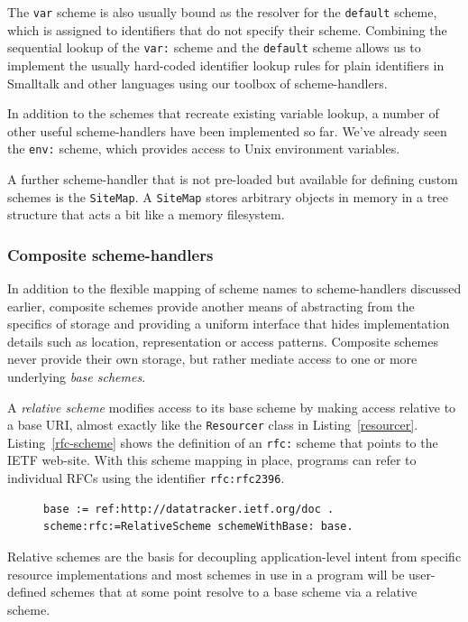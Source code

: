\documentclass[preprint]{sigplanconf}
\begin{document}
The {\tt var} scheme is also usually bound as the resolver for the {\tt default}
scheme, which is assigned to identifiers that do not specify their scheme.
Combining the sequential lookup of the {\tt var:} scheme and the {\tt default}
scheme allows us to implement the usually hard-coded identifier lookup
rules for plain identifiers in Smalltalk and other languages using
our toolbox of scheme-handlers.

In addition to the schemes that recreate existing variable lookup, a number
of other useful scheme-handlers have been implemented so far.  We've
already seen the {\tt env:} scheme, which provides access to Unix
environment variables.  

A further scheme-handler that is not pre-loaded but available for defining
custom schemes is the {\tt SiteMap}.  A {\tt SiteMap} stores arbitrary objects
in memory in a tree structure that acts a bit like a memory filesystem.

\subsubsection{Composite scheme-handlers}

In addition to the flexible mapping of scheme names to scheme-handlers discussed
earlier, composite schemes provide another means of abstracting from the specifics 
of storage and providing a uniform interface that hides implementation details such
as location, representation or access patterns.  Composite schemes never provide
their own storage, but rather mediate access to one or more underlying \emph{base schemes}.

A \emph{relative scheme} modifies access to its base scheme by making
access relative to a base URI, almost exactly like the {\tt Resourcer} class 
in Listing~\ref{resourcer}.  Listing~\ref{rfc-scheme} shows the definition
of an {\tt rfc:} scheme that points to the IETF web-site.   With this scheme mapping in place,
programs can refer to individual RFCs using the identifier {\tt  rfc:rfc2396}.

\begin{figure}[htbp]
\begin{lstlisting}[style=numbers,label=rfc-scheme,caption=Defining a custom rfc: scheme.]
base := ref:http://datatracker.ietf.org/doc .
scheme:rfc:=RelativeScheme schemeWithBase: base.
\end{lstlisting}
\end{figure}

Relative schemes are
the basis for decoupling application-level intent from specific resource implementations
and most schemes in use in a program will be user-defined schemes that at
some point resolve to a base scheme via a relative scheme. 
\end{document}
